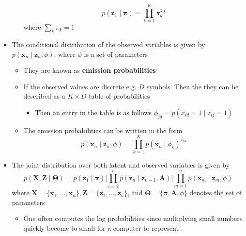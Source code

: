 \documentclass[a4, english]{article}
\begin{document}
\begin{itemize}
\begin{itemize}
\begin{equation*}
      p(\pmb z_1 \mid \pmb \pi) = \prod_{k=1}^K \pi_k^{z_{1k}}
    \end{equation*}
where $\sum_k \pi_k = 1$ 
  \end{itemize} 
  \item The conditional distribution of the observed variables is given by $p(\pmb x_n \mid \pmb z_n, \phi)$, where $\phi$ is a set of parameters 
  \begin{itemize}
  	\item They are known as \textbf{emission probabilities}
    \item If the observed values are discrete e.g. $D$ symbols. Then the they can be described as a $K \times D$ table of probabilities    
    \begin{itemize}
    	\item Then an entry in the table is as follows $\phi_{jd} = p(x_{id} = 1 \mid z_{ij} = 1 )$ 
    \end{itemize}
    \item The emission probabilities can be written in the form  
    \begin{equation*}
      p(\pmb x_n \mid \pmb z_n, \phi) = \prod_{k=1}^K p(\pmb x_n \mid \phi_k)^{z_{nk}}
    \end{equation*}
  \end{itemize}
  \item The joint distribution over both latent and observed variables is given by
\begin{equation*}
  p(\pmb X, \pmb Z \mid \pmb \Theta) = p(\pmb z_1 \mid \pmb \pi) \bigg [ \prod_{i=2}^n p(\pmb z_n \mid \pmb z_{n-1}, \pmb A) \bigg ] \prod_{m=1}^n p(\pmb x_m \mid \pmb z_m , \phi)
\end{equation*}
where $\pmb X = \{\pmb x_1, \dots, \pmb x_n\}, \pmb Z = \{\pmb z_1, \dots, \pmb z_n\}$, and $\pmb \Theta = \{\pmb \pi, \pmb A, \phi \}$ denotes the set of parameters
  \begin{itemize}
  	\item One often computes the log probabilities since multiplying small numbers quickly become to small for a computer to represent 
  \end{itemize}
\end{itemize}
  
\end{document}
